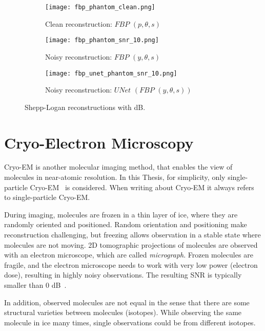 \begin{figure}[H]
    \captionsetup[subfigure]{justification=centering}
    \centering
    \begin{subfigure}[t]{0.3\textwidth}
        \texttt{[image: fbp\_phantom\_clean.png]}
        \caption{Clean reconstruction: $\textit{FBP }(p, \theta, s)$}
        \label{fig:fbp_phantom}
    \end{subfigure}\hfill
    \begin{subfigure}[t]{0.3\textwidth}
      \texttt{[image: fbp\_phantom\_snr\_10.png]}
      \caption{Noisy reconstruction: $\textit{FBP }(y, \theta, s)$}
      \label{fig:fbp_phantom_noisy}
    \end{subfigure}\hfill
    \begin{subfigure}[t]{0.3\textwidth}
      \texttt{[image: fbp\_unet\_phantom\_snr\_10.png]}
      \caption{Noisy reconstruction: $\textit{UNet }(\textit{FBP }(y, \theta, s))$}
      \label{fig:fbp_unet_phantom_noisy}
    \end{subfigure}
    \caption{Shepp-Logan reconstructions with  dB.}
    \label{fig:phantom_fbps}
  \end{figure}


\section{Cryo-Electron Microscopy}
Cryo-EM is another molecular imaging method, that enables the view of molecules in near-atomic resolution.
In this Thesis, for simplicity, only single-particle Cryo-EM~\cite{singleParticleCryoEm} is considered.
When writing about Cryo-EM it always refers to single-particle Cryo-EM.

During imaging, molecules are frozen in a thin layer of ice, where they are randomly oriented and positioned. 
Random orientation and positioning make reconstruction challenging, 
but freezing allows observation in a stable state where molecules are not moving.
2D tomographic projections of molecules are observed with an electron microscope, which are called \textit{micrograph}. 
Frozen molecules are fragile, and the electron microscope needs to work with
very low power (electron dose), resulting in highly noisy observations. The resulting SNR
is typically smaller than 0 dB~\cite{cryoEmMath2}.

In addition, observed molecules are not equal in the sense that there are some structural varieties between
molecules (isotopes). While observing the same molecule in ice many times, single observations could be from different isotopes.


